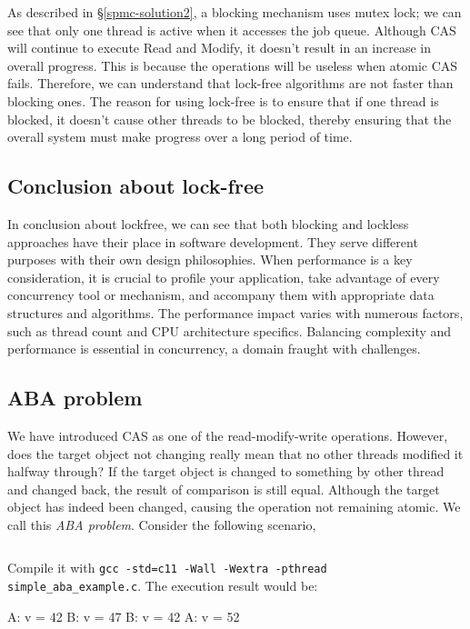 \documentclass[fontsize=10pt, oneside]{scrartcl}
\newcommand{\monobox}[1]{\mbox{\texttt{#1}}}
\newcommand{\introduce}[1]{\textit{#1}}
\newcommand{\secref}[1]{\hyperref[#1]{\textsc{\S}\ref*{#1}}}
\begin{document}
As described in \secref{spmc-solution2}, a blocking mechanism uses mutex lock; 
we can see that only one thread is active when it accesses the job queue. 
Although \textsc{CAS} will continue to execute Read and Modify, 
it doesn't result in an increase in overall progress. 
This is because the operations will be useless when atomic \textsc{CAS} fails. 
Therefore, we can understand that lock-free algorithms are not faster than blocking ones. 
The reason for using lock-free is to ensure that if one thread is blocked, 
it doesn't cause other threads to be blocked, 
thereby ensuring that the overall system must make progress over a long period of time.

\subsection{Conclusion about lock-free}
In conclusion about lockfree, 
we can see that both blocking and lockless approaches have their place in software development. 
They serve different purposes with their own design philosophies. 
When performance is a key consideration, it is crucial to profile your application, 
take advantage of every concurrency tool or mechanism, and accompany them with appropriate data structures and algorithms. 
The performance impact varies with numerous factors, such as thread count and CPU architecture specifics. 
Balancing complexity and performance is essential in concurrency, 
a domain fraught with challenges.

\subsection{ABA problem}
We have introduced CAS as one of the read-modify-write operations.
However, does the target object not changing really mean that no other threads modified it halfway through?
If the target object is changed to something by other thread and changed back, the result of comparison is still equal.
Although the target object has indeed been changed, causing the operation not remaining atomic.
We call this \introduce{ABA problem}.
Consider the following scenario,

\inputminted{c}{./examples/simple_aba_example.c}

Compile it with \monobox{gcc -std=c11 -Wall -Wextra -pthread simple\_aba\_example.c}.
The execution result would be:

\begin{ccode}
    A: v = 42
    B: v = 47
    B: v = 42
    A: v = 52
\end{ccode}
\end{document}
